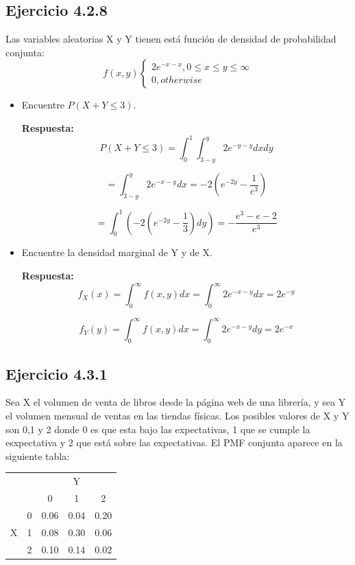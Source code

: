 \documentclass{article}\usepackage[]{graphicx}\usepackage[]{color}
\begin{document}
\subsection{Ejercicio 4.2.8}
Las variables aleatorias X y Y tienen está función de densidad de probabilidad conjunta:
$$f(x,y) \begin{cases} 2e^{-x-x}, 0 \leq x\leq y\leq \infty
 \\ 0, otherwise\end{cases} $$
\begin{itemize}
\item Encuentre $P(X + Y \leq 3)$.

\textbf{Respuesta:}
\[P(X+Y\leq 3) = \int_{0}^{1}\int_{3-y}^{y}2e^{-y-y}dxdy\]

\[= \int_{3-y}^{y}2e^{-x-y}dx = -2(e^{-2y}-\frac{1}{e^{3}})\]

\[= \int_{0}^{1}(-2(e^{-2y}-\frac{1}{3})dy)=-\frac{e^{3}-e-2}{e^{3}}\]




\item Encuentre la densidad marginal de Y y de X.

\textbf{Respuesta:}
\[f_{X}(x)=\int_{0}^{\infty }f(x,y)dx = \int_{0}^{\infty }2e^{-x-y}dx = 2e^{-y}\]

\[f_{Y}(y)=\int_{0}^{\infty }f(x,y)dx = \int_{0}^{\infty }2e^{-x-y}dy = 2e^{-x}\]

\end{itemize}

 
\subsection{Ejercicio 4.3.1}
Sea X el volumen de venta de libros desde la página web de una librería, y sea Y el volumen mensual de ventas en las tiendas físicas. Los posibles valores de X y Y son 0,1 y 2 donde 0 es que esta bajo las expectativas, 1 que se cumple la esxpectativa y 2 que está sobre las expectativas. El PMF conjunta aparece en la siguiente tabla:
\begin{table}[H]
\centering
\begin{tabular}{cc|ccc}
                       &   &                           & Y                         &      \\ \cline{3-5} 
                       &   & \multicolumn{1}{c|}{0}    & \multicolumn{1}{c|}{1}    & 2    \\ \hline
\multicolumn{1}{c|}{}  & 0 & \multicolumn{1}{c|}{0.06} & \multicolumn{1}{c|}{0.04} & 0.20 \\ \hline
\multicolumn{1}{c|}{X} & 1 & \multicolumn{1}{c|}{0.08} & \multicolumn{1}{c|}{0.30} & 0.06 \\ \hline
\multicolumn{1}{c|}{}  & 2 & \multicolumn{1}{c|}{0.10} & \multicolumn{1}{c|}{0.14} & 0.02
\end{tabular}
\end{table}
\end{document}
